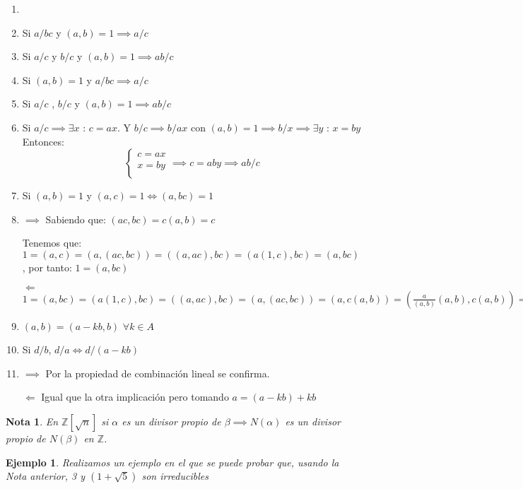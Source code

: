 \documentclass[11pt, a4paper, titlepage]{article}
\makeatletter
\renewenvironment{proof}[1][\proofname] {\vspace{-15pt}\par\pushQED{\qed}\normalfont\topsep6\p@\@plus6\p@\relax\trivlist\item[\hskip\labelsep\it#1\@addpunct{.}]\ignorespaces}{\popQED\endtrivlist\@endpefalse}
\theoremstyle{theorem-style}
\theoremstyle{definition-style}
\theoremstyle{remark-style}
\newtheorem*{nota}{Nota}
\theoremstyle{example-style}
\newtheorem*{ejemplo}{Ejemplo}
\newenvironment{nlist}
{\begin{enumerate}
\renewcommand\labelenumi{(\emph{\roman{enumi})}}}
{\end{enumerate}}
\makeatother
\begin{document}
\begin{nlist}
\begin{proof}
\end{proof}

\item Si $a/bc$ y $(a,b) = 1 \implies a/c$ 

\item Si $a/c$ y $b/c$ y $(a,b) = 1 \implies ab/c$
	\item Si $(a,b)=1 $ y $a/bc \implies a/c$
	\item Si $a/c$ , $b/c$ y $(a,b)=1 \implies ab/c$
	\item Si $a/c \implies \exists x$ : $c=ax$. Y $b/c \implies b/ax$ con $(a,b)=1 \implies b/x \implies \exists y$ : $x=by$
	Entonces: 
	\[
		\begin{cases}
			c=ax \\
			x=by \\
		\end{cases} \implies c=aby \implies ab/c
	\]
	\item Si $(a,b)=1$ y $(a,c)=1 \iff (a,bc)=1$ \\
	\begin{proof}
	$\boxed{\implies}$ Sabiendo que: $(ac,bc)=c(a,b)=c$
	
	Tenemos que: $1=(a,c)=(a,(ac,bc))=((a,ac),bc)=(a(1,c),bc)=(a,bc)$, por tanto: $1=(a,bc)$
	
	$\boxed{\Longleftarrow}$ $1=(a,bc)=(a(1,c),bc)=((a,ac),bc)=(a,(ac,bc))=(a,c(a,b))=(\frac{a}{(a,b)}(a,b),c(a,b))=(a,b)(\frac{a}{(a,b)},c)=1 \implies (a,b)\in U(A)\implies (a,b)=1\implies (a,c)\in U(A)\implies (a,c)=1$
\end{proof}
	\item $(a,b)=(a-kb,b)$ $\forall k \in A$
	\item Si $d/b$, $d/a \iff d/(a-kb)$ \\
	\begin{proof}
	$\boxed{\implies}$ Por la propiedad de combinación lineal se confirma.
	
	$\boxed{\Longleftarrow}$ Igual que la otra implicación pero tomando $a=(a-kb)+kb$
	\end{proof}
\end{nlist}

\begin{nota}
En $\mathbb{Z}[\sqrt{n}]$ si $\alpha$ es un divisor propio de $\beta \implies N(\alpha)$ es un divisor propio de $N(\beta)$ en $\mathbb{Z}$.
\end{nota}

\begin{ejemplo}
Realizamos un ejemplo en el que se puede probar que, usando la Nota anterior, 3 y $(1+\sqrt{5})$ son irreducibles	
\end{ejemplo}
\end{document}
